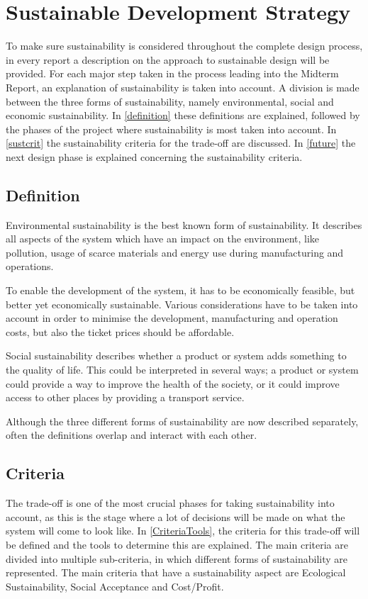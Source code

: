 \newpage
\chapter{Sustainable Development Strategy}
\label{ch-SDS}
To make sure sustainability is considered throughout the complete design process, in every report a description on the approach to sustainable design will be provided. For each major step taken in the process leading into the Midterm Report, an explanation of sustainability is taken into account. A division is made between the three forms of sustainability, namely environmental, social and economic sustainability. In \autoref{definition} these definitions are explained, followed by the phases of the project where sustainability is most taken into account. In \autoref{sustcrit} the sustainability criteria for the trade-off are discussed. In \autoref{future} the next design phase is explained concerning the sustainability criteria.

\section{Definition}
\label{definition}
Environmental sustainability is the best known form of sustainability. It describes all aspects of the system which have an impact on the environment, like pollution, usage of scarce materials and energy use during manufacturing and operations.

To enable the development of the system, it has to be economically feasible, but better yet economically sustainable. Various considerations have to be taken into account in order to minimise the development, manufacturing and operation costs, but also the ticket prices should be affordable.

Social sustainability describes whether a product or system adds something to the quality of life. This could be interpreted in several ways; a product or system could provide a way to improve the health of the society, or it could improve access to other places by providing a transport service.

Although the three different forms of sustainability are now described separately, often the definitions overlap and interact with each other. 


\section{Criteria}
\label{sustcrit}
The trade-off is one of the most crucial phases for taking sustainability into account, as this is the stage where a lot of decisions will be made on what the system will come to look like. In \autoref{CriteriaTools}, the criteria for this trade-off will be defined and the tools to determine this are explained. The main criteria are divided into multiple sub-criteria, in which different forms of sustainability are represented. The main criteria that have a sustainability aspect are Ecological Sustainability, Social Acceptance and Cost/Profit. 


